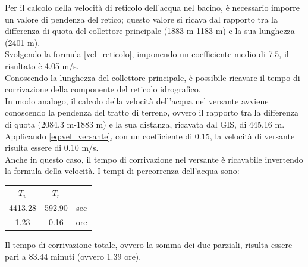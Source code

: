 Per il calcolo della velocità di reticolo dell'acqua nel bacino, è necessario imporre un valore di pendenza del retico; questo valore si ricava dal rapporto tra la differenza di quota del collettore principale (1883 m-1183 m) e la sua lunghezza (2401 m).\\
Svolgendo la formula \ref{vel_reticolo}, imponendo un coefficiente medio di 7.5, il risultato è 4.05 \unit{m/s}.\\
Conoscendo la lunghezza del collettore principale, è possibile ricavare il tempo di corrivazione della componente del reticolo idrografico.\\
In modo analogo, il calcolo della velocità dell'acqua nel versante avviene conoscendo la pendenza del tratto di terreno, ovvero il rapporto tra la differenza di quota (2084.3 m-1883 m) e la sua distanza, ricavata dal GIS, di 445.16 m.\\
Applicando \eqref{eq:vel_versante}, con un coefficiente di 0.15, la velocità di versante risulta essere di 0.10 \unit{m/s}.\\
Anche in questo caso, il tempo di corrivazione nel versante è ricavabile invertendo la formula della velocità.
I tempi di percorrenza dell'acqua sono:
\begin{table}[H] \centering
    \begin{tabular}{ccc}
        \toprule
    \textbf{$T_v$} & \textbf{$T_r$} & {\color[HTML]{000000} } \\
    4413.28     & 592.90      & sec                     \\
    1.23        & 0.16        & ore       \\
    \bottomrule             
    \end{tabular}
    \end{table}
Il tempo di corrivazione totale, ovvero la somma dei due parziali, risulta essere pari a 83.44 minuti (ovvero 1.39 ore).


